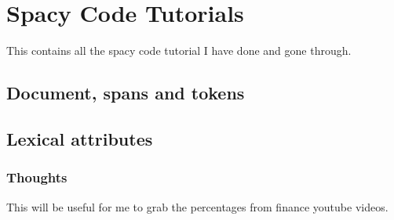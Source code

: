 \section{Spacy Code Tutorials}

This contains all the spacy code tutorial I have done and gone through.




\subsection{Document, spans and tokens}





\subsection{Lexical attributes}



\subsubsection{Thoughts}
This will be useful for me to grab the percentages from finance youtube videos.